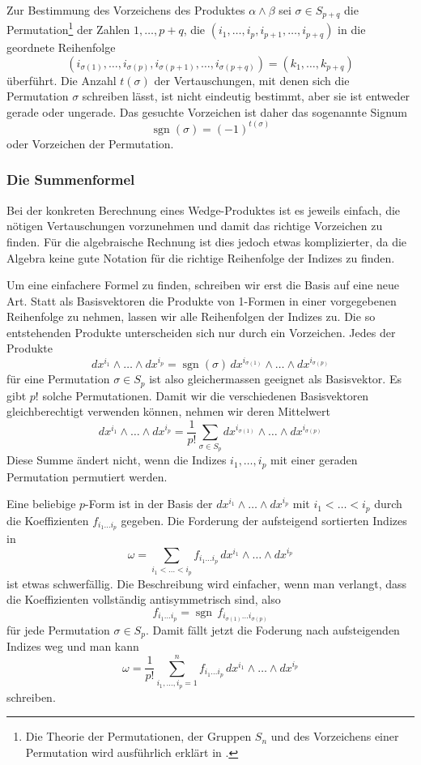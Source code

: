 Zur Bestimmung des Vorzeichens des Produktes $\alpha\wedge\beta$ 
sei $\sigma\in S_{p+q}$ die Permutation\footnote{Die Theorie der
Permutationen, der Gruppen $S_n$ und des Vorzeichens einer Permutation
wird ausführlich erklärt in \cite[Abschnitt~4.3.4]{buch:linalg}.}
der Zahlen $1,\dots,p+q$,
die $(i_1,\dots,i_p,i_{p+1},\dots,i_{p+q})$ in die geordnete
Reihenfolge
\[
(i_{\sigma(1)},\dots,i_{\sigma(p)},i_{\sigma(p+1)},\dots,i_{\sigma(p+q)})
=
(k_1,\dots,k_{p+q})
\]
überführt.
Die Anzahl $t(\sigma)$ der Vertauschungen, mit denen sich die
Permutation $\sigma$ schreiben lässt, ist nicht eindeutig bestimmt,
aber sie ist entweder gerade oder ungerade.
Das gesuchte Vorzeichen ist daher das sogenannte Signum
\[
\operatorname{sgn}(\sigma) = (-1)^{t(\sigma)}
\]
oder Vorzeichen der Permutation.

%
%
\subsubsection{Die Summenformel}
Bei der konkreten Berechnung eines Wedge-Produktes ist es jeweils
einfach, die nötigen Vertauschungen vorzunehmen und damit das
richtige Vorzeichen zu finden.
Für die algebraische Rechnung ist dies jedoch etwas komplizierter,
da die Algebra keine gute Notation für die richtige Reihenfolge der
Indizes zu finden.

Um eine einfachere Formel zu finden, schreiben wir erst die Basis
auf eine neue Art.
Statt als Basisvektoren die Produkte von 1-Formen in einer vorgegebenen
Reihenfolge zu nehmen, lassen wir alle Reihenfolgen der Indizes zu.
Die so entstehenden Produkte unterscheiden sich nur durch ein
Vorzeichen.
Jedes der Produkte
\[
dx^{i_1}\wedge\dots\wedge dx^{i_p}
=
\operatorname{sgn}(\sigma)
\,
dx^{i_{\sigma(1)}} \wedge\dots\wedge dx^{i_{\sigma(p)}}
\]
für eine Permutation $\sigma\in S_p$ ist also gleichermassen geeignet
als Basisvektor.
Es gibt $p!$ solche Permutationen.
Damit wir die verschiedenen Basisvektoren gleichberechtigt verwenden
können, nehmen wir deren Mittelwert
\[
dx^{i_1}\wedge\dots\wedge dx^{i_p}
=
\frac{1}{p!}
\sum_{\sigma\in S_p} dx^{i_{\sigma(1)}} \wedge\dots\wedge dx^{i_{\sigma(p)}}
\]
Diese Summe ändert nicht, wenn die Indizes $i_1,\dots,i_p$ mit einer
geraden Permutation permutiert werden.

Eine beliebige $p$-Form ist in der Basis der
$dx^{i_1}\wedge\dots\wedge dx^{i_p}$  mit $i_1<\dots<i_p$
durch die Koeffizienten $f_{i_1\dots i_p}$ gegeben.
Die Forderung der aufsteigend sortierten Indizes in
\[
\omega
=
\sum_{i_1<\dots<i_p}
f_{i_1\dots i_p}\,
dx^{i_1}\wedge\dots\wedge dx^{i_p}
\]
ist etwas schwerfällig.
Die Beschreibung wird einfacher, wenn man verlangt, dass die
Koeffizienten vollständig antisymmetrisch sind, also
\[
f_{i_1\dots i_p}
=
\operatorname{sgn}\,
f_{i_{\sigma(1)}\dots i_{\sigma(p)}}
\]
für jede Permutation $\sigma\in S_p$.
Damit fällt jetzt die Foderung nach aufsteigenden Indizes weg und man
kann
\begin{equation}
\omega
=
\frac{1}{p!}
\sum_{i_1,\dots,i_p=1}^n
f_{i_1\dots i_p}
\,
dx^{i_1}\wedge\dots\wedge dx^{i_p}
\label{buch:pformen:pformen:eqn:summenformel}
\end{equation}
schreiben.

